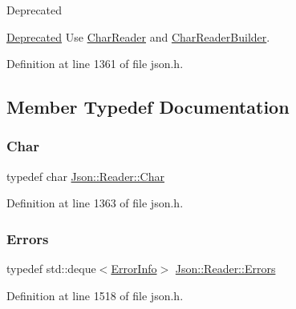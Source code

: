 \begin{DoxyRefDesc}{Deprecated}
\item[\hyperlink{deprecated__deprecated000005}{Deprecated}]Use \hyperlink{class_json_1_1_char_reader}{Char\+Reader} and \hyperlink{class_json_1_1_char_reader_builder}{Char\+Reader\+Builder}. \end{DoxyRefDesc}


Definition at line 1361 of file json.\+h.



\subsection{Member Typedef Documentation}
\mbox{\label{class_json_1_1_reader_a3eec9118f3e9a672ba8348c3a79d0f45}} 
\subsubsection{\texorpdfstring{Char}{Char}}
{\footnotesize\ttfamily typedef char \hyperlink{class_json_1_1_reader_a3eec9118f3e9a672ba8348c3a79d0f45}{Json\+::\+Reader\+::\+Char}}



Definition at line 1363 of file json.\+h.

\mbox{\label{class_json_1_1_reader_aae51e8f5bab3f067261c842a3ef858e5}} 
\subsubsection{\texorpdfstring{Errors}{Errors}}
{\footnotesize\ttfamily typedef std\+::deque$<$\hyperlink{class_json_1_1_reader_1_1_error_info}{Error\+Info}$>$ \hyperlink{class_json_1_1_reader_aae51e8f5bab3f067261c842a3ef858e5}{Json\+::\+Reader\+::\+Errors}\hspace{0.3cm}{\ttfamily [private]}}



Definition at line 1518 of file json.\+h.

\mbox{\label{class_json_1_1_reader_a46795b5b272bf79a7730e406cb96375a}} 
